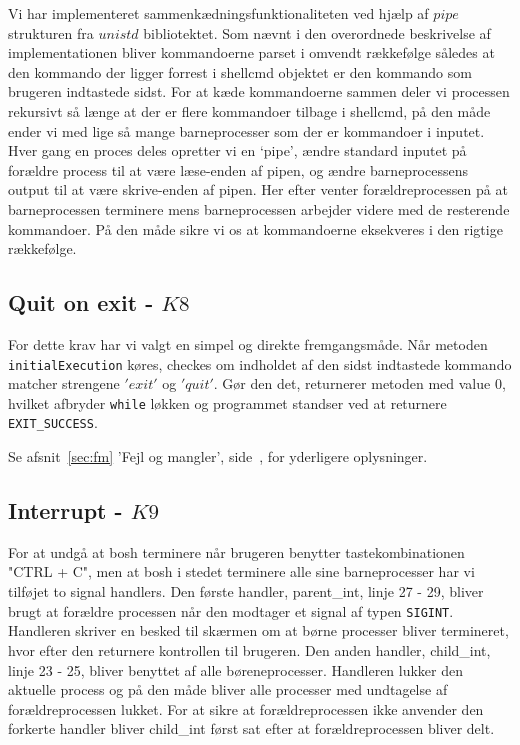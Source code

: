 \documentclass{article}
\begin{document}
Vi har implementeret sammenkædningsfunktionaliteten ved hjælp af $pipe$ strukturen fra $unistd$ bibliotektet. Som nævnt i den overordnede beskrivelse af implementationen bliver kommandoerne parset i omvendt rækkefølge således at den kommando der ligger forrest i shellcmd objektet er den kommando som brugeren indtastede sidst. For at kæde kommandoerne sammen deler vi processen rekursivt så længe at der er flere kommandoer tilbage i shellcmd, på den måde ender vi med lige så mange barneprocesser som der er kommandoer i inputet. Hver gang en proces deles opretter vi en ‘pipe’, ændre standard inputet på forældre process til at være læse-enden af pipen, og ændre barneprocessens output til at være skrive-enden af pipen. Her efter venter forældreprocessen på at barneprocessen terminere mens barneprocessen arbejder videre med de resterende kommandoer. På den måde sikre vi os at kommandoerne eksekveres i den rigtige rækkefølge. 

\subsection{Quit on exit - $K8$}
For dette krav har vi valgt en simpel og direkte fremgangsmåde. Når metoden \texttt{initialExecution} køres, checkes om indholdet af den sidst indtastede kommando matcher strengene $'exit'$ og $'quit'$. Gør den det, returnerer metoden med value $0$, hvilket afbryder \texttt{while} løkken og programmet standser ved at returnere \texttt{EXIT\_SUCCESS}.

Se afsnit~\ref{sec:fm} 'Fejl og mangler', side~\pageref{sec:fm}, for yderligere oplysninger.

\subsection{Interrupt - $K9$}
For at undgå at bosh terminere når brugeren benytter tastekombinationen "CTRL + C", men at bosh i stedet terminere alle sine barneprocesser har vi tilføjet to signal handlers. Den første handler, parent\_int, linje 27 - 29, bliver brugt at forældre processen når den modtager et signal af typen \texttt{SIGINT}. Handleren skriver en besked til skærmen om at børne processer bliver termineret, hvor efter den returnere kontrollen til brugeren. 
Den anden handler, child\_int, linje 23 - 25, bliver benyttet af alle børeneprocesser. Handleren lukker den aktuelle process og på den måde bliver alle processer med undtagelse af forældreprocessen lukket. For at sikre at forældreprocessen ikke anvender den forkerte handler bliver child\_int først sat efter at forældreprocessen bliver delt.\\
\end{document}
